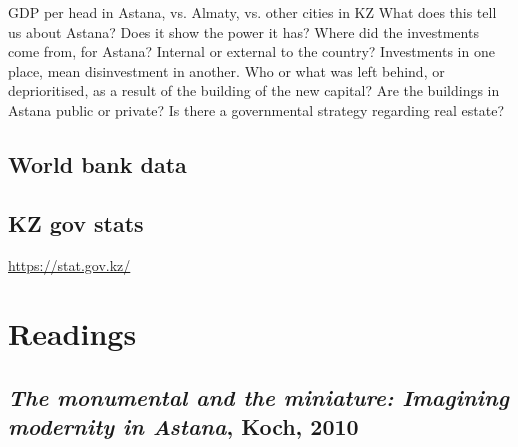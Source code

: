 \documentclass{article}
\begin{document}

\begin{outline}
	\1 GDP per head in Astana, vs. Almaty, vs. other cities in KZ
		\2 What does this tell us about Astana? Does it show the power it has?
	\1 Where did the investments come from, for Astana? Internal or external to the country?
		\2 Investments in one place, mean disinvestment in another. Who or what was left behind, or deprioritised, as a result of the building of the new capital?
	\1 Are the buildings in Astana public or private?
		\2 Is there a governmental strategy regarding real estate?
\end{outline}

\subsection{World bank data}

\subsection{KZ gov stats}

\url{https://stat.gov.kz/}

\section{Readings}

\subsection{\textit{The monumental and the miniature: Imagining modernity in Astana}, Koch, 2010}
\end{document}
